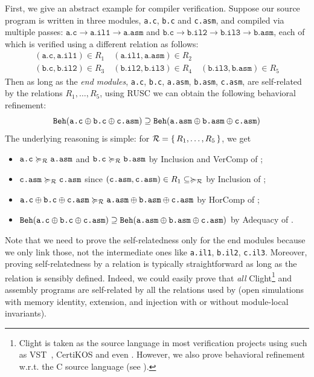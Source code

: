 First, we give an abstract example for compiler
verification.  Suppose our source program is written in three modules,
\texttt{a.c}, \texttt{b.c} and \texttt{c.asm}, and compiled via
multiple passes: $\texttt{a.c}\to\texttt{a.il1}\to\texttt{a.asm}$ and
$\texttt{b.c}\to\texttt{b.il2}\to\texttt{b.il3}\to\texttt{b.asm}$,
each of which is verified using a different relation as follows:
\[
\begin{array}{l}
  (\texttt{a.c},\texttt{a.il1}) \in R_1 \quad (\texttt{a.il1},\texttt{a.asm}) \in R_2 \\
  (\texttt{b.c},\texttt{b.il2}) \in R_3 \quad
  (\texttt{b.il2},\texttt{b.il3}) \in R_4 \quad
  (\texttt{b.il3},\texttt{b.asm}) \in R_5
\end{array}
\]
%
Then as long as the \emph{end modules}, \texttt{a.c}, \texttt{b.c}, \texttt{a.asm},
\texttt{b.asm}, \texttt{c.asm}, are self-related by the relations $R_1,\ldots,R_5$,
using RUSC we can obtain the following behavioral refinement:
\[
\mathtt{Beh}({\texttt{a.c} \oplus \texttt{b.c} \oplus \texttt{c.asm}}) \supseteq \mathtt{Beh}({\texttt{a.asm} \oplus \texttt{b.asm} \oplus \texttt{c.asm}})
\]
The underlying reasoning is simple: for $\mathcal{R}=\{\, R_1,\ldots,R_5 \,\}$, we get
\begin{itemize}
\item $\texttt{a.c} \succcurlyeq_{\mathcal{R}} \texttt{a.asm}$ and $\texttt{b.c} \succcurlyeq_{\mathcal{R}} \texttt{b.asm}$
  by Inclusion and VerComp of ;
\item $\texttt{c.asm} \succcurlyeq_{\mathcal{R}} \texttt{c.asm}$ since
  $(\texttt{c.asm},\texttt{c.asm}) \in R_1 \subseteq \succcurlyeq_{\mathcal{R}}$
  by Inclusion of ;
\item $\texttt{a.c} \oplus \texttt{b.c} \oplus \texttt{c.asm} \succcurlyeq_{\mathcal{R}} \texttt{a.asm} \oplus \texttt{b.asm} \oplus \texttt{c.asm}$
  by HorComp of ;
\item $\mathtt{Beh}({\texttt{a.c} \oplus \texttt{b.c} \oplus \texttt{c.asm}}) \supseteq \mathtt{Beh}({\texttt{a.asm} \oplus \texttt{b.asm} \oplus \texttt{c.asm}})$ by Adequacy of .
\end{itemize}
Note that we need to prove the self-relatedness only for the end
modules because we only link those, not the intermediate ones
like \texttt{a.il1}, \texttt{b.il2}, \texttt{c.il3}.
Moreover, proving self-relatedness by a relation is typically
straightforward as long as the relation is sensibly defined.  Indeed,
we could easily prove that \emph{all} Clight\footnote{Clight is taken
  as the source language in most verification projects using \cc{}
  such as VST~\cite{VST}, CertiKOS and even \ccc{}.
  However, we also prove behavioral refinement w.r.t. the C source language
  (see ).
}
and assembly programs are
self-related by all the relations used by \ccm{}
(\ie open simulations with memory identity, extension,
and injection with or without module-local invariants).

